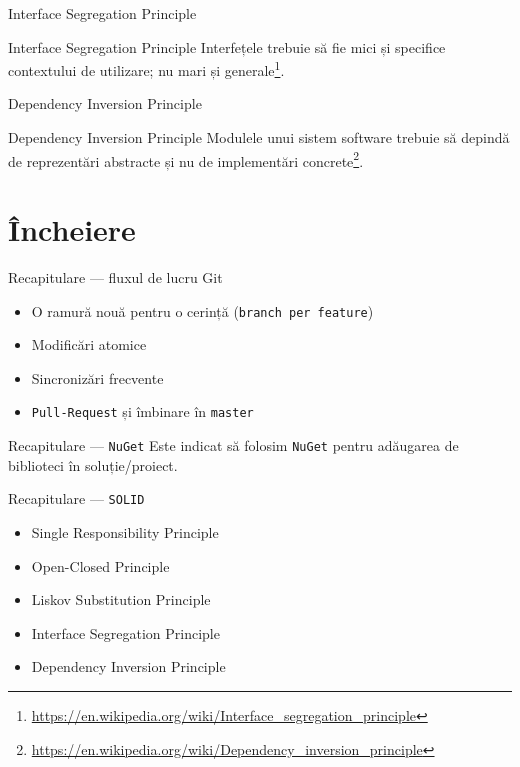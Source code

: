 \documentclass[presentation]{beamer}
\begin{document}
\begin{frame}[label={sec:orge089924}]{Interface Segregation Principle}
\begin{block}{Interface Segregation Principle}
Interfețele trebuie să fie mici și specifice contextului de utilizare; nu mari și generale\footnote{\url{https://en.wikipedia.org/wiki/Interface\_segregation\_principle}}.
\end{block}
\end{frame}
\begin{frame}[label={sec:orgabaa785}]{Dependency Inversion Principle}
\begin{block}{Dependency Inversion Principle}
Modulele unui sistem software trebuie să depindă de reprezentări abstracte și nu de implementări concrete\footnote{\url{https://en.wikipedia.org/wiki/Dependency\_inversion\_principle}}.
\end{block}
\end{frame}
\section{Încheiere}
\label{sec:orga54c08b}
\begin{frame}[label={sec:orgf85c2e1},fragile]{Recapitulare --- fluxul de lucru Git}
 \begin{itemize}
\item O ramură nouă pentru o cerință (\texttt{branch per feature})
\item Modificări atomice
\item Sincronizări frecvente
\item \texttt{Pull-Request} și îmbinare în \texttt{master}
\end{itemize}
\end{frame}
\begin{frame}[label={sec:org6833631},fragile]{Recapitulare --- \texttt{NuGet}}
 Este indicat să folosim \texttt{NuGet} pentru adăugarea de biblioteci în soluție/proiect.
\end{frame}
\begin{frame}[label={sec:org3c35317},fragile]{Recapitulare --- \texttt{SOLID}}
 \begin{itemize}
\item \alert{Single Responsibility Principle}
\item \alert{Open-Closed Principle}
\item \alert{Liskov Substitution Principle}
\item \alert{Interface Segregation Principle}
\item \alert{Dependency Inversion Principle}
\end{itemize}
\end{frame}
\end{document}
